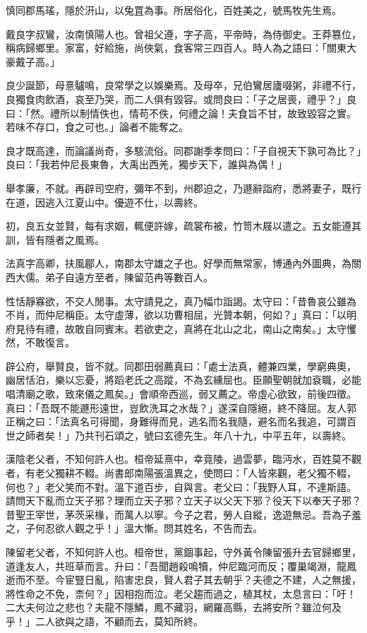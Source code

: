 \begin{pinyinscope}
慎同郡馬瑤，隱於汧山，以兔罝為事。所居俗化，百姓美之，號馬牧先生焉。

戴良字叔鸞，汝南慎陽人也。曾祖父遵，字子高，平帝時，為侍御史。王莽篡位，稱病歸鄉里。家富，好給施，尚俠氣，食客常三四百人。時人為之語曰：「關東大豪戴子高。」

良少誕節，母憙驢鳴，良常學之以娛樂焉。及母卒，兄伯鸞居廬啜粥，非禮不行，良獨食肉飲酒，哀至乃哭，而二人俱有毀容。或問良曰：「子之居喪，禮乎？」良曰：「然。禮所以制情佚也，情苟不佚，何禮之論！夫食旨不甘，故致毀容之實。若味不存口，食之可也。」論者不能奪之。

良才既高達，而論議尚奇，多駭流俗。同郡謝季孝問曰：「子自視天下孰可為比？」良曰：「我若仲尼長東魯，大禹出西羌，獨步天下，誰與為偶！」

舉孝廉，不就。再辟司空府，彌年不到，州郡迫之，乃遯辭詣府，悉將妻子，既行在道，因逃入江夏山中。優遊不仕，以壽終。

初，良五女並賢，每有求姻，輒便許嫁，疏裳布被，竹笥木屐以遣之。五女能遵其訓，皆有隱者之風焉。

法真字高卿，扶風郿人，南郡太守雄之子也。好學而無常家，博通內外圖典，為關西大儒。弟子自遠方至者，陳留范冉等數百人。

性恬靜寡欲，不交人閒事。太守請見之，真乃幅巾詣謁。太守曰：「昔魯哀公雖為不肖，而仲尼稱臣。太守虛薄，欲以功曹相屈，光贊本朝，何如？」真曰：「以明府見待有禮，故敢自同賓末。若欲吏之，真將在北山之北，南山之南矣。」太守戄然，不敢復言。

辟公府，舉賢良，皆不就。同郡田弱薦真曰：「處士法真，體兼四業，學窮典奧，幽居恬泊，樂以忘憂，將蹈老氏之高蹤，不為玄纁屈也。臣願聖朝就加袞職，必能唱清廟之歌，致來儀之鳳矣。」會順帝西巡，弱又薦之。帝虛心欲致，前後四徵。真曰：「吾既不能遯形遠世，豈飲洗耳之水哉？」遂深自隱絕，終不降屈。友人郭正稱之曰：「法真名可得聞，身難得而見，逃名而名我隨，避名而名我追，可謂百世之師者矣！」乃共刊石頌之，號曰玄德先生。年八十九，中平五年，以壽終。

漢陰老父者，不知何許人也。桓帝延熹中，幸竟陵，過雲夢，臨沔水，百姓莫不觀者，有老父獨耕不輟。尚書郎南陽張溫異之，使問曰：「人皆來觀，老父獨不輟，何也？」老父笑而不對。溫下道百步，自與言。老父曰：「我野人耳，不達斯語。請問天下亂而立天子邪？理而立天子邪？立天子以父天下邪？役天下以奉天子邪？昔聖王宰世，茅茨采椽，而萬人以寧。今子之君，勞人自縱，逸遊無忌。吾為子羞之，子何忍欲人觀之乎！」溫大慚。問其姓名，不告而去。

陳留老父者，不知何許人也。桓帝世，黨錮事起，守外黃令陳留張升去官歸鄉里，道逢友人，共班草而言。升曰：「吾聞趙殺鳴犢，仲尼臨河而反；覆巢竭淵，龍鳳逝而不至。今宦豎日亂，陷害忠良，賢人君子其去朝乎？夫德之不建，人之無援，將性命之不免，柰何？」因相抱而泣。老父趨而過之，植其杖，太息言曰：「吁！二大夫何泣之悲也？夫龍不隱鱗，鳳不藏羽，網羅高縣，去將安所？雖泣何及乎！」二人欲與之語，不顧而去，莫知所終。


\end{pinyinscope}
